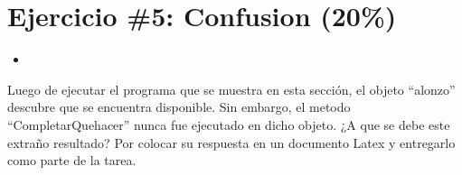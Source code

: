 \documentclass{article}
\newcommand{\perlscript}[2]{
\begin{itemize}
\item[]
\end{itemize}
}
\begin{document}
\section*{Ejercicio \#5: Confusion (20\%)}

\perlscript{./Programa}{Confusion}

Luego de ejecutar el programa que se muestra en esta secci\'on, el objeto
``alonzo'' descubre que se encuentra disponible. Sin embargo, el metodo
``CompletarQuehacer'' nunca fue ejecutado en dicho objeto. ¿A que se debe
este extra\~no resultado? Por colocar su respuesta en un documento Latex
y entregarlo como parte de la tarea.



\end{document}
